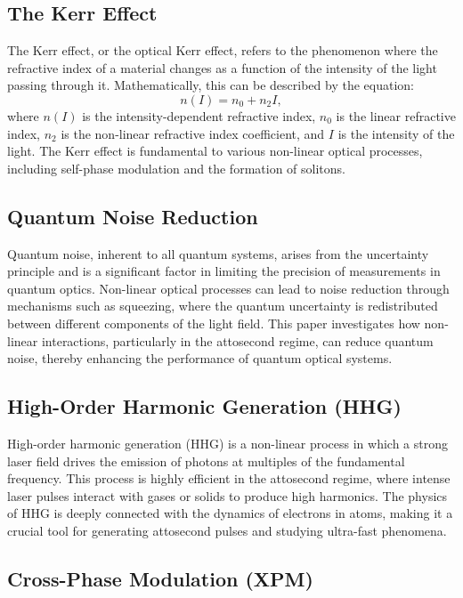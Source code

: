 \documentclass[12pt]{article}
\begin{document}
\subsection{The Kerr Effect}

The Kerr effect, or the optical Kerr effect, refers to the phenomenon where the refractive index of a material changes as a function of the intensity of the light passing through it. Mathematically, this can be described by the equation:
\begin{equation}
n(I) = n_0 + n_2 I,
\end{equation}
where \( n(I) \) is the intensity-dependent refractive index, \( n_0 \) is the linear refractive index, \( n_2 \) is the non-linear refractive index coefficient, and \( I \) is the intensity of the light. The Kerr effect is fundamental to various non-linear optical processes, including self-phase modulation and the formation of solitons.

\subsection{Quantum Noise Reduction}

Quantum noise, inherent to all quantum systems, arises from the uncertainty principle and is a significant factor in limiting the precision of measurements in quantum optics. Non-linear optical processes can lead to noise reduction through mechanisms such as squeezing, where the quantum uncertainty is redistributed between different components of the light field. This paper investigates how non-linear interactions, particularly in the attosecond regime, can reduce quantum noise, thereby enhancing the performance of quantum optical systems.

\subsection{High-Order Harmonic Generation (HHG)}

High-order harmonic generation (HHG) is a non-linear process in which a strong laser field drives the emission of photons at multiples of the fundamental frequency. This process is highly efficient in the attosecond regime, where intense laser pulses interact with gases or solids to produce high harmonics. The physics of HHG is deeply connected with the dynamics of electrons in atoms, making it a crucial tool for generating attosecond pulses and studying ultra-fast phenomena.

\subsection{Cross-Phase Modulation (XPM)}
\end{document}

